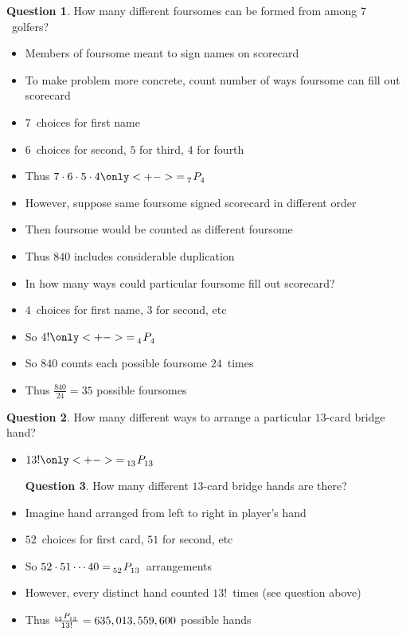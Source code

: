 \documentclass[handout]{beamer}
\theoremstyle{definition}
\newtheorem{question}{Question}
\newcommand\npr[2]{\tensor[_{#1}]P{_{#2}}}
\begin{document}
\begin{frame}
\begin{question}
How many different foursomes can be formed
from among $7$~golfers?
\end{question}
\begin{itemize}
\item Members of foursome meant to sign names on scorecard
\item To make problem more concrete,
count number of ways foursome can fill out scorecard
\item $7$~choices for first name
\item $6$~choices for second, $5$ for third, $4$ for fourth
\item Thus $7\cdot 6\cdot 5\cdot 4
\only<+->{=\npr{7}{4}}$
\end{itemize}
\end{frame}
\begin{frame}
\begin{itemize}
\item However, suppose same foursome signed scorecard in different order
\item Then foursome would be counted as \alert{different foursome}
\item Thus $840$ includes considerable duplication
\item In how many ways could particular foursome fill out scorecard?
\item $4$~choices for first name, $3$ for second, etc
\item So $4!\only<+->{=\npr{4}{4}}$
\item So $840$ counts each possible foursome $24$~times 
\item Thus $\frac{840}{24}=35$ possible foursomes
\end{itemize}
\end{frame}

\begin{frame}
\begin{question}
How many different ways to arrange a particular $13$-card
bridge hand?
\end{question}
\begin{itemize}
\item $13!\only<+->{=\npr{13}{13}}$
\begin{question}
How many different $13$-card bridge hands are there?
\end{question}
\item Imagine hand arranged from left to right in player's hand
\item $52$~choices for first card, $51$ for second, etc
\item So $52\cdot 51\cdots 40=\npr{52}{13}$ arrangements
\item However, every distinct hand counted $13!$~times (see question above)
\item Thus $\frac{\npr{52}{13}}{13!}
=635,013,559,600$ possible hands
\end{itemize}
\end{frame}
\end{document}
